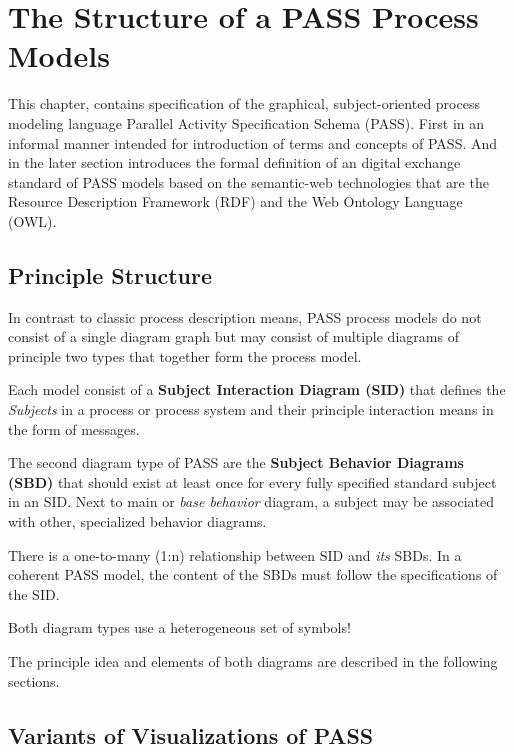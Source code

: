 \chapter{The Structure of a PASS Process Models}
\label{PASSStruct}

This chapter, contains specification of the graphical, subject-oriented process modeling language Parallel Activity Specification Schema (PASS). First in an informal manner intended for introduction of terms and concepts of PASS. And in the later section introduces the formal definition of an digital exchange standard of PASS models based on the semantic-web technologies that are the Resource Description Framework (RDF) and the Web Ontology Language (OWL). 


\section{Principle Structure}

In contrast to classic process description means, PASS process models do not consist of a single diagram graph but may consist of multiple diagrams of principle two types that together form the process model.

Each model consist of a \textbf{Subject Interaction Diagram (SID)} that defines the \textit{Subjects} in a process or process system and their principle interaction means in the form of messages.

The second diagram type of PASS are the \textbf{Subject Behavior Diagrams (SBD)} that should exist at least once for every fully specified standard subject in an SID. Next to main or \textit{base behavior} diagram, a subject may be associated with other, specialized behavior diagrams.

There is a one-to-many (1:n) relationship between SID and \textit{its} SBDs. In a coherent PASS model, the content of the SBDs must follow the specifications of the SID.

Both diagram types use a heterogeneous set of symbols!

The principle idea and elements of both diagrams are described in the following sections.





\section{Variants of Visualizations of PASS}